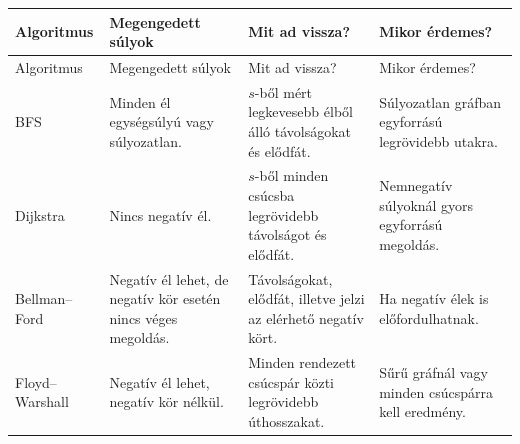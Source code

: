 \begingroup
\setlength{\tabcolsep}{3.5pt}
\begin{longtable}{L{0.20\textwidth}L{0.27\textwidth}L{0.26\textwidth}L{0.17\textwidth}}
\toprule
Algoritmus & Megengedett súlyok & Mit ad vissza? & Mikor érdemes? \\
\midrule
\endfirsthead
\toprule
Algoritmus & Megengedett súlyok & Mit ad vissza? & Mikor érdemes? \\
\midrule
\endhead
BFS & Minden él egységsúlyú vagy súlyozatlan. & $s$-ből mért legkevesebb élből álló távolságokat és elődfát. & Súlyozatlan gráfban egyforrású legrövidebb utakra. \\
Dijkstra & Nincs negatív él. & $s$-ből minden csúcsba legrövidebb távolságot és elődfát. & Nemnegatív súlyoknál gyors egyforrású megoldás. \\
Bellman--Ford & Negatív él lehet, de negatív kör esetén nincs véges megoldás. & Távolságokat, elődfát, illetve jelzi az elérhető negatív kört. & Ha negatív élek is előfordulhatnak. \\
Floyd--Warshall & Negatív él lehet, negatív kör nélkül. & Minden rendezett csúcspár közti legrövidebb úthosszakat. & Sűrű gráfnál vagy minden csúcspárra kell eredmény. \\
\bottomrule
\end{longtable}
\endgroup
